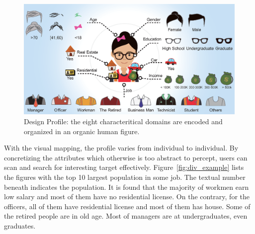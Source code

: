 \begin{figure}[htb!]
 \centering %
 \includegraphics[width=\columnwidth]{pictures/design_profile}
 \caption{Design Profile: the eight characteritical domains are encoded and organized in an organic human figure.}
 \label{fig:design_profile}
\end{figure}

With the visual mapping, the profile varies from individual to individual. By concretizing the attributes which otherwise is too abstract to percept, users can scan and search for interesting target effectively. Figure~\ref{fig:div_example} lists the figures with the top 10 largest population in some job. The textual number beneath indicates the population. It is found that the majority of workmen earn low salary and most of them have no residential license. On the contrary, for the officers, all of them have residential license and most of them has house. Some of the retired people are in old age. Most of managers are at undergraduates, even graduates. 


